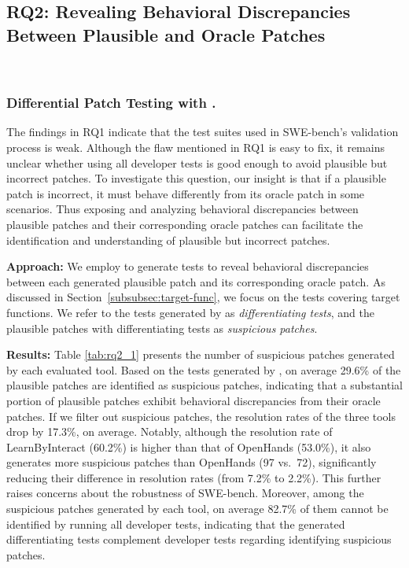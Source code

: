 \subsection{RQ2: Revealing Behavioral Discrepancies Between Plausible and Oracle Patches}~\label{sec:rq2}

\vspace{-0.2cm}


\subsubsection{Differential Patch Testing with \appname.}
The findings in RQ1 indicate that the test suites used in SWE-bench's validation process is weak.
Although the flaw mentioned in RQ1 is easy to fix,
it remains unclear whether using all developer tests is good enough to avoid plausible but incorrect patches.
To investigate this question, our insight is that if a plausible patch is incorrect, it must behave differently from its oracle patch in some scenarios.
Thus exposing and analyzing behavioral discrepancies between plausible patches and their corresponding oracle patches can facilitate the identification and understanding of plausible but incorrect patches.

\noindent \textbf{Approach:}
We employ \appname to generate tests to reveal behavioral discrepancies between each generated plausible patch and its corresponding oracle patch.
As discussed in Section~\ref{subsubsec:target-func}, we focus on the tests covering target functions. 
We refer to the tests generated by \appname as \emph{differentiating tests}, and the plausible patches with differentiating tests as \emph{suspicious patches}.

\vspace{-5pt}



\noindent \textbf{Results:}
Table \ref{tab:rq2_1} presents the number of suspicious patches generated by each evaluated tool.
Based on the tests generated by \appname, on average 29.6\% of the plausible patches are identified as suspicious patches, 
indicating that a substantial portion of plausible patches exhibit behavioral discrepancies from their oracle patches. 
If we filter out suspicious patches, the resolution rates of the three tools drop by 17.3\%, on average.
Notably, although the resolution rate of LearnByInteract (60.2\%) is higher than that of OpenHands (53.0\%), it also generates more suspicious patches than OpenHands (97 vs.\ 72), significantly reducing their difference in resolution rates (from 7.2\% to 2.2\%).
This further raises concerns about the robustness of SWE-bench.
Moreover, among the suspicious patches generated by each tool, on average 82.7\% of them cannot be identified by running all developer tests, indicating that the generated differentiating tests complement developer tests regarding identifying suspicious patches.

